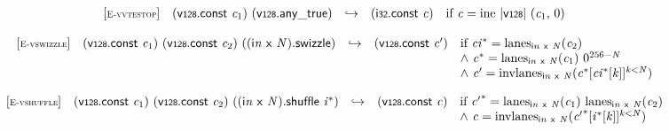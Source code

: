 \vspace{1ex}

$$
\begin{array}{@{}l@{}lcl@{}l@{}}
{[\textsc{\scriptsize E{-}vvtestop}]} \quad & (\mathsf{v{\scriptstyle128}}.\mathsf{const}~{\mathit{c}}_{{1}})~(\mathsf{v{\scriptstyle128}} . \mathsf{any\_true}) &\hookrightarrow& (\mathsf{i{\scriptstyle32}}.\mathsf{const}~{\mathit{c}}) &\quad
  \mbox{if}~{\mathit{c}} = {\mathrm{ine}}~{|\mathsf{v{\scriptstyle128}}|}~({\mathit{c}}_{{1}},\, 0) \\
\end{array}
$$

\vspace{1ex}

$$
\begin{array}{@{}l@{}lcl@{}l@{}}
{[\textsc{\scriptsize E{-}vswizzle}]} \quad & (\mathsf{v{\scriptstyle128}}.\mathsf{const}~{\mathit{c}}_{{1}})~(\mathsf{v{\scriptstyle128}}.\mathsf{const}~{\mathit{c}}_{{2}})~(({\mathsf{i}}{{\mathit{n}}}~\mathsf{x}~{\mathit{N}}).\mathsf{swizzle}) &\hookrightarrow& (\mathsf{v{\scriptstyle128}}.\mathsf{const}~{\mathit{c}'}) &\quad
  \mbox{if}~{{\mathit{ci}}^\ast} = {{\mathrm{lanes}}}_{{\mathsf{i}}{{\mathit{n}}}~\mathsf{x}~{\mathit{N}}}({\mathit{c}}_{{2}}) \\
 &&&&\quad {\land}~{{\mathit{c}}^\ast} = {{\mathrm{lanes}}}_{{\mathsf{i}}{{\mathit{n}}}~\mathsf{x}~{\mathit{N}}}({\mathit{c}}_{{1}})~{0^{256 - {\mathit{N}}}} \\
 &&&&\quad {\land}~{\mathit{c}'} = {{\mathrm{invlanes}}}_{{\mathsf{i}}{{\mathit{n}}}~\mathsf{x}~{\mathit{N}}}({{{\mathit{c}}^\ast}[{{\mathit{ci}}^\ast}[{\mathit{k}}]]^{{\mathit{k}}<{\mathit{N}}}}) \\
\end{array}
$$

\vspace{1ex}

$$
\begin{array}{@{}l@{}lcl@{}l@{}}
{[\textsc{\scriptsize E{-}vshuffle}]} \quad & (\mathsf{v{\scriptstyle128}}.\mathsf{const}~{\mathit{c}}_{{1}})~(\mathsf{v{\scriptstyle128}}.\mathsf{const}~{\mathit{c}}_{{2}})~(({\mathsf{i}}{{\mathit{n}}}~\mathsf{x}~{\mathit{N}}).\mathsf{shuffle}~{{\mathit{i}}^\ast}) &\hookrightarrow& (\mathsf{v{\scriptstyle128}}.\mathsf{const}~{\mathit{c}}) &\quad
  \mbox{if}~{{\mathit{c}'}^\ast} = {{\mathrm{lanes}}}_{{\mathsf{i}}{{\mathit{n}}}~\mathsf{x}~{\mathit{N}}}({\mathit{c}}_{{1}})~{{\mathrm{lanes}}}_{{\mathsf{i}}{{\mathit{n}}}~\mathsf{x}~{\mathit{N}}}({\mathit{c}}_{{2}}) \\
 &&&&\quad {\land}~{\mathit{c}} = {{\mathrm{invlanes}}}_{{\mathsf{i}}{{\mathit{n}}}~\mathsf{x}~{\mathit{N}}}({{{\mathit{c}'}^\ast}[{{\mathit{i}}^\ast}[{\mathit{k}}]]^{{\mathit{k}}<{\mathit{N}}}}) \\
\end{array}
$$

